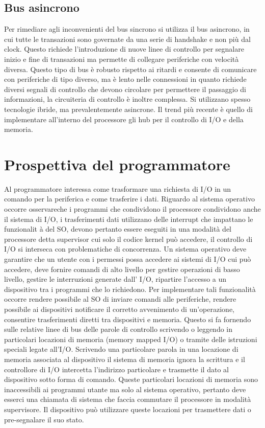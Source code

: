 \subsection{Bus asincrono}
Per rimediare agli inconvenienti del bus sincrono si utilizza il bus asincrono, in cui tutte le transazioni sono governate da una serie di handshake e non pi\`u dal 
clock. Questo richiede l'introduzione di nuove linee di controllo per segnalare inizio e fine di transazioni ma permette di collegare periferiche con velocit\`a diversa. 
Questo tipo di bus \`e robusto rispetto ai ritardi e consente di comunicare con periferiche di tipo diverso, ma \`e lento nelle connessioni in quanto richiede diversi 
segnali di controllo che devono circolare per permettere il passaggio di informazioni, la circuiteria di controllo \`e inoltre complessa. Si utilizzano spesso tecnologie
ibride, ma prevalentemente asincrone. Il trend pi\`u recente \`e quello di implementare all'interno del processore gli hub per il controllo di I/O e della memoria. 
\section{Prospettiva del programmatore}
Al programmatore interessa come trasformare una richiesta di I/O in un comando per la periferica e come trasferire i dati. Riguardo al sistema operativo occorre 
osservareche i programmi che condividono il processore condividono anche il sistema di I/O, i trasferimenti dati utilizzano delle interrupt che impattano le funzionalit
\`a del SO, devono pertanto essere eseguiti in una modalit\`a del processore detta supervisor cui solo il codice kernel pu\`o accedere, il controllo di I/O si interseca 
con problematiche di concorrenza. Un sistema operativo deve garantire che un utente con i permessi possa accedere ai sistemi di I/O cui pu\`o accedere, deve fornire 
comandi di alto livello per gestire operazioni di basso livello, gestire le interruzioni generate dall' I/O, ripartire l'accesso a un dispositivo tra i programmi che lo 
richiedono. Per implementare tali funzionalit\`a occorre rendere possibile al SO di inviare comandi alle periferiche, rendere possibile ai dispositivi notificare il 
corretto avvenimento di un'operazione, consentire trasferimenti diretti tra dispositivi e memoria. Questo si fa fornendo sulle relative linee di bus delle parole di 
controllo scrivendo o leggendo in particolari locazioni di memoria (memory mapped I/O) o tramite delle istruzioni speciali legate all'I/O. Scrivendo una particolare 
parola in una locazione di memoria associata al dispositivo il sistema di memoria ignora la scrittura e il controllore di I/O intercetta l'indirizzo particolare e 
trasmette il dato al dispositivo sotto forma di comando. Queste particolari locazioni di memoria sono inaccessibili ai programmi utante ma solo al sistema operativo,
pertanto deve esserci una chiamata di sistema che faccia commutare il processore in modalit\`a supervisore. Il dispositivo pu\`o utilizzare queste locazioni per 
trasmettere dati o pre-segnalare il suo stato. 
